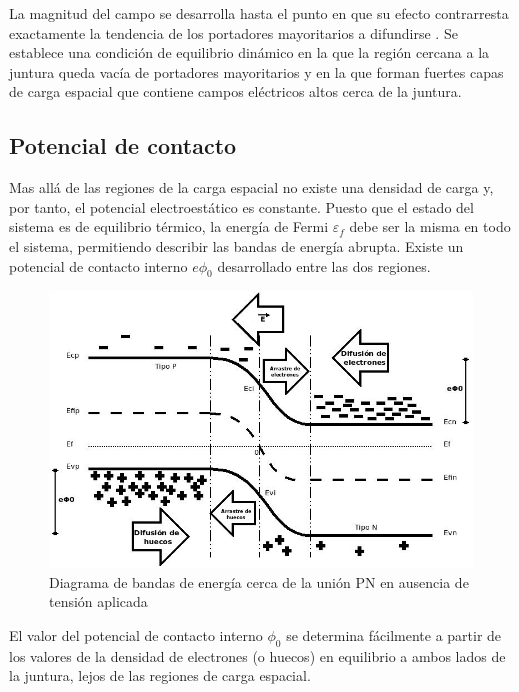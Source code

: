 \documentclass[oneside]{book}
\numberwithin{equation}{section}
\numberwithin{figure}{section}
\numberwithin{table}{section}
\begin{document}
				La magnitud del campo se desarrolla hasta el punto en que su efecto contrarresta exactamente la tendencia de los portadores mayoritarios a difundirse	. Se establece una condición de equilibrio dinámico en la que la región cercana a la juntura queda vacía de portadores mayoritarios y en la que forman fuertes capas de carga espacial que contiene campos eléctricos altos cerca de la juntura.				
			
			\subsection{Potencial de contacto}
			
				Mas allá de las regiones de la carga espacial no existe una densidad de carga y, por tanto, el potencial electroestático es constante. Puesto que el estado del sistema es de equilibrio térmico, la energía de Fermi $\varepsilon_f$ debe ser la misma en todo el sistema, permitiendo describir las bandas de energía abrupta. Existe un potencial de contacto interno $e\phi_0$ desarrollado entre las dos regiones.
				
				\begin{figure}[H]
					\begin{center}
						\includegraphics[scale=0.5]{Fermi-PN.jpeg}
						\caption{Diagrama de bandas de energía cerca de la unión PN en ausencia de tensión aplicada}
					\end{center}
				\end{figure}			
						
				
				El valor del potencial de contacto interno $\phi_0$ se determina fácilmente a partir de los valores de la densidad de electrones (o huecos) en equilibrio a ambos lados de la juntura, lejos de las regiones de carga espacial.
				
\end{document}
